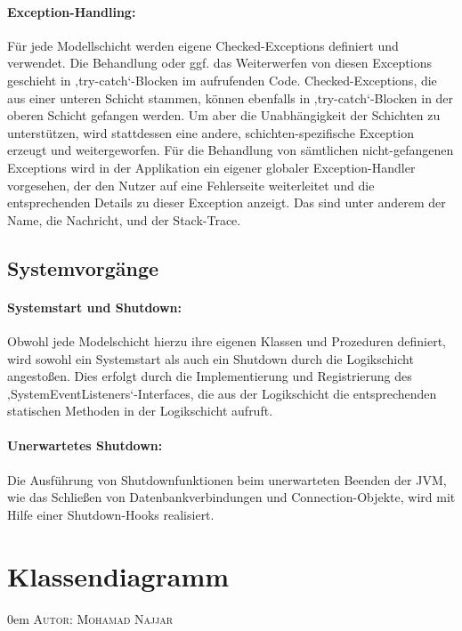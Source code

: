 \documentclass{article}
\makeatletter
\newcommand{\sectionauthor}[1]{
	{\parindent 0em \large \scshape Autor: #1 \par \nobreak \vspace*{1em}}
	\@afterheading
}
\makeatother
\begin{document}
\paragraph{Exception-Handling:}
Für jede Modellschicht werden eigene Checked-Exceptions definiert und verwendet. Die Behandlung oder ggf. das Weiterwerfen von diesen Exceptions geschieht in ‚try-catch‘-Blocken im aufrufenden Code.
Checked-Exceptions, die aus einer unteren Schicht stammen, können ebenfalls in ‚try-catch‘-Blocken in der oberen Schicht gefangen werden.
Um aber die Unabhängigkeit der Schichten zu unterstützen, wird stattdessen eine andere, schichten-spezifische Exception erzeugt und weitergeworfen.
Für die Behandlung von sämtlichen nicht-gefangenen Exceptions wird in der Applikation ein eigener globaler Exception-Handler vorgesehen, der den Nutzer auf eine Fehlerseite weiterleitet und die entsprechenden Details zu dieser Exception anzeigt.
Das sind unter anderem der Name, die Nachricht, und der Stack-Trace.



\subsection{Systemvorgänge}

\paragraph{Systemstart und Shutdown:}
Obwohl jede Modelschicht hierzu ihre eigenen Klassen und Prozeduren definiert, wird sowohl ein Systemstart als auch ein Shutdown durch die Logikschicht angestoßen.
Dies erfolgt durch die Implementierung und Registrierung des ‚SystemEventListeners‘-Interfaces, die aus der Logikschicht die entsprechenden statischen Methoden in der Logikschicht aufruft.

\paragraph{Unerwartetes Shutdown:}
Die Ausführung von Shutdownfunktionen beim unerwarteten Beenden der JVM, wie das Schließen von Datenbankverbindungen und Connection-Objekte, wird mit Hilfe einer Shutdown-Hooks realisiert.




\section{Klassendiagramm}
\sectionauthor{Mohamad Najjar}
\end{document}
